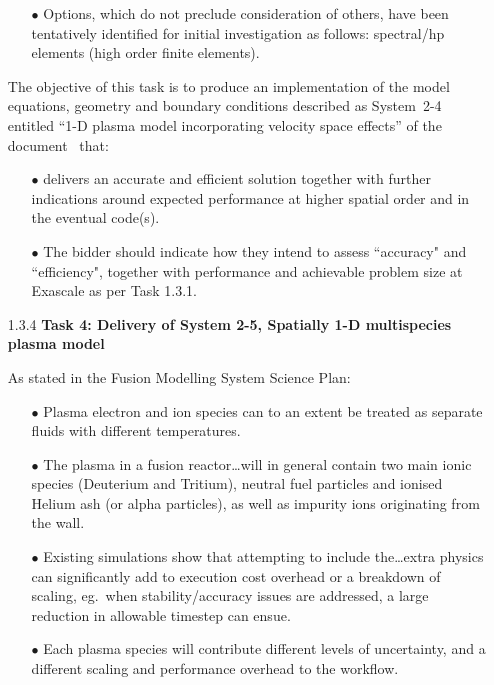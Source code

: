 \begin{itemize}
\begin{itemize}
\item[$\bullet$] Options, which do not preclude consideration of others, have been tentatively 
identified for initial investigation as follows: spectral/hp elements (high order 
finite elements).
\end{itemize}

The objective of this task is to produce an implementation of the model equations, 
geometry and boundary conditions described as System~2-4 entitled ``1-D plasma 
model incorporating velocity space effects'' of the document~\cite{pappeqs} that: 

\begin{itemize}
\item[$\bullet$] delivers an accurate and efficient solution together with further indications 
around expected performance at higher spatial order and in the eventual code(s). 

\item[$\bullet$] The bidder should indicate how they intend to assess ``accuracy" and ``efficiency",
together with performance and achievable problem size at Exascale as per Task 1.3.1.
\end{itemize}

\item[1.3.4]\textbf{Task 4: Delivery of System 2-5, Spatially 1-D multispecies plasma
model }

As stated in the Fusion Modelling System Science Plan: 

\begin{itemize}
\item[$\bullet$] Plasma electron and ion species can to an extent be treated as separate 
fluids with different temperatures. 

\item[$\bullet$] The plasma in a fusion reactor\ldots will in general contain two main ionic 
species (Deuterium and Tritium), neutral fuel particles and ionised Helium ash 
(or alpha particles), as well as impurity ions originating from the wall. 

\item[$\bullet$] Existing simulations show that attempting to include the\ldots extra physics 
can significantly add to execution cost overhead or a breakdown of scaling, eg.\ 
when stability/accuracy issues are addressed, a large reduction in allowable timestep 
can ensue. 

\item[$\bullet$] Each plasma species will contribute different levels of uncertainty, and 
a different scaling and performance overhead to the workflow. 


\end{itemize}
\end{itemize}
